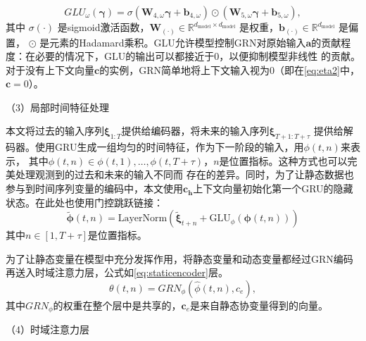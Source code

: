 \begin{equation}
    GLU_{\omega}(\boldsymbol{\gamma }) = \sigma(\mathbf{W}_{4,\omega} \mathbf{\boldsymbol{\gamma }} + \mathbf{b}_{4,\omega}) \odot (\mathbf{W}_{5,\omega} \mathbf{\boldsymbol{\gamma }} + \mathbf{b}_{5,\omega}),
\end{equation}
其中 $\sigma(\cdot)$ 是sigmoid激活函数，$\mathbf{W}_{(\cdot)} \in \mathbb{R}^{d_{\text{model}} \times d_{\text{model}}}$ 是权重，$\mathbf{b}_{(\cdot)} \in \mathbb{R}^{d_{\text{model}}}$ 是偏置，
$\odot $ 是元素的Hadamard乘积。GLU允许模型控制GRN对原始输入$\mathbf{a}$的贡献程度：在必要的情况下，GLU的输出可以都接近于0，以便抑制模型非线性
的贡献。对于没有上下文向量$\mathbf{c}$的实例，GRN简单地将上下文输入视为0（即在\eqref{eq:eta2}中，$\mathbf{c}=0$）。

（3）局部时间特征处理

本文将过去的输入序列$\bm{\xi}_{1:T}$提供给编码器，将未来的输入序列$\bm{\xi}_{T+1:T+\tau}$
提供给解码器。使用GRU生成一组均匀的时间特征，作为下一阶段的输入，用$\phi (t,n)$来表示，
其中$\phi(t,n) \in {\phi(t, 1), \ldots, \phi(t, T+\tau)}$，$n$是位置指标。这种方式也可以完美处理观测到的过去和未来的输入不同而
存在的差异。同时，为了让静态数据也参与到时间序列变量的编码中，本文使用$\mathbf{c_h}$上下文向量初始化第一个GRU的隐藏状态。在此处也使用门控跳跃链接：
\begin{equation}
    \tilde{\bm{\phi}}(t, n) = \text{LayerNorm}\left(\tilde{\bm{\xi}}_{t+n} + \text{GLU}_{\phi}(\bm{\phi}(t, n))\right)
\end{equation}
其中$n \in [1, T+\tau]$是位置指标。

为了让静态变量在模型中充分发挥作用，将静态变量和动态变量都经过GRN编码再送入时域注意力层，公式如\eqref{eq:staticencoder}层。
\begin{equation}
    \theta(t, n) = GRN_{\phi}(\hat{\phi}(t, n), c_e),
    \label{eq:staticencoder}
\end{equation}
其中$GRN_{\phi}$的权重在整个层中是共享的，$\mathbf{c}_e$是来自静态协变量得到的向量。

（4）时域注意力层

